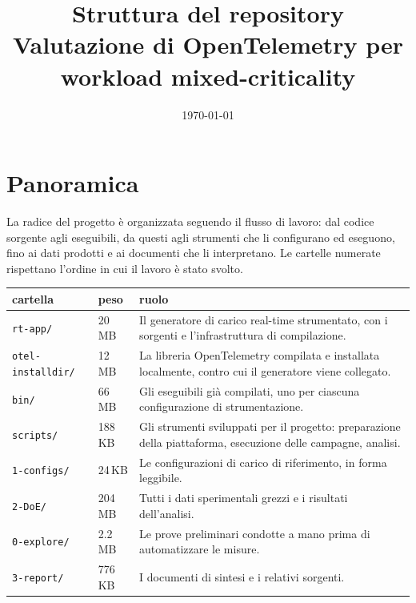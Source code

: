 \title{\vspace{-1.6cm}\textbf{Struttura del repository}\\[.2em]
\large Valutazione di OpenTelemetry per workload mixed-criticality}
\author{}
\date{\today}


\maketitle
\vspace{-1.4cm}

\section*{Panoramica}

La radice del progetto \`e organizzata seguendo il flusso di lavoro: dal codice sorgente agli
eseguibili, da questi agli strumenti che li configurano ed eseguono, fino ai dati prodotti e ai
documenti che li interpretano. Le cartelle numerate rispettano l'ordine in cui il lavoro \`e stato
svolto.

\begin{center}\small
\begin{tabular}{p{3.1cm}p{1.3cm}p{9.9cm}}
\toprule
\textbf{cartella} & \textbf{peso} & \textbf{ruolo} \\
\midrule
\texttt{rt-app/} & 20\,MB & Il generatore di carico real-time strumentato, con i sorgenti e l'infrastruttura di compilazione. \\
\texttt{otel-installdir/} & 12\,MB & La libreria OpenTelemetry compilata e installata localmente, contro cui il generatore viene collegato. \\
\texttt{bin/} & 66\,MB & Gli eseguibili gi\`a compilati, uno per ciascuna configurazione di strumentazione. \\
\texttt{scripts/} & 188\,KB & Gli strumenti sviluppati per il progetto: preparazione della piattaforma, esecuzione delle campagne, analisi. \\
\texttt{1-configs/} & 24\,KB & Le configurazioni di carico di riferimento, in forma leggibile. \\
\texttt{2-DoE/} & 204\,MB & Tutti i dati sperimentali grezzi e i risultati dell'analisi. \\
\texttt{0-explore/} & 2.2\,MB & Le prove preliminari condotte a mano prima di automatizzare le misure. \\
\texttt{3-report/} & 776\,KB & I documenti di sintesi e i relativi sorgenti. \\
\bottomrule
\end{tabular}
\end{center}

